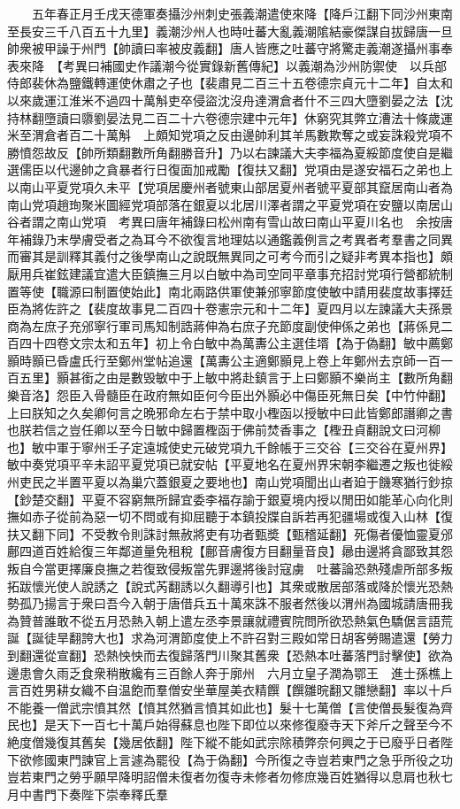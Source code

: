 　　五年春正月壬戌天德軍奏攝沙州刺史張義潮遣使來降【降戶江翻下同沙州東南至長安三千八百五十九里】義潮沙州人也時吐蕃大亂義潮隂結豪傑謀自拔歸唐一旦帥衆被甲譟于州門【帥讀曰率被皮義翻】唐人皆應之吐蕃守將驚走義潮遂攝州事奉表來降　【考異曰補國史作議潮今從實錄新舊傳紀】以義潮為沙州防禦使　以兵部侍郎裴休為鹽鐵轉運使休肅之子也【裴肅見二百三十五卷德宗貞元十二年】自太和以來歲運江淮米不過四十萬斛吏卒侵盜沈沒舟達渭倉者什不三四大墮劉晏之法【沈持林翻墮讀曰隳劉晏法見二百二十六卷德宗建中元年】休窮究其弊立漕法十條歲運米至渭倉者百二十萬斛　上頗知党項之反由邊帥利其羊馬數欺奪之或妄誅殺党項不勝憤怨故反【帥所類翻數所角翻勝音升】乃以右諫議大夫李福為夏綏節度使自是繼選儒臣以代邊帥之貪暴者行日復面加戒勵【復扶又翻】党項由是遂安福石之弟也上以南山平夏党項久未平【党項居慶州者號東山部居夏州者號平夏部其竄居南山者為南山党項趙珣聚米圖經党項部落在銀夏以北居川澤者謂之平夏党項在安鹽以南居山谷者謂之南山党項　考異曰唐年補錄曰松州南有雪山故曰南山平夏川名也　余按唐年補錄乃末學膚受者之為耳今不欲復言地理姑以通鑑義例言之考異者考羣書之同異而審其是訓釋其義付之後學南山之說既無異同之可考今而引之疑非考異本指也】頗厭用兵崔鉉建議宜遣大臣鎮撫三月以白敏中為司空同平章事充招討党項行營都統制置等使【職源曰制置使始此】南北兩路供軍使兼邠寧節度使敏中請用裴度故事擇廷臣為將佐許之【裴度故事見二百四十卷憲宗元和十二年】夏四月以左諫議大夫孫景商為左庶子充邠寧行軍司馬知制誥蔣伸為右庶子充節度副使伸係之弟也【蔣係見二百四十四卷文宗太和五年】初上令白敏中為萬夀公主選佳壻【為于偽翻】敏中薦鄭顥時顥已昏盧氏行至鄭州堂帖追還【萬夀公主適鄭顥見上卷上年鄭州去京師一百一百五里】顥甚銜之由是數毁敏中于上敏中將赴鎮言于上曰鄭顥不樂尚主【數所角翻樂音洛】怨臣入骨髓臣在政府無如臣何今臣出外顥必中傷臣死無日矣【中竹仲翻】上曰朕知之久矣卿何言之晩邪命左右于禁中取小檉函以授敏中曰此皆鄭郎譖卿之書也朕若信之豈任卿以至今日敏中歸置檉函于佛前焚香事之【檉丑貞翻說文曰河柳也】敏中軍于寧州壬子定遠城使史元破党項九千餘帳于三交谷【三交谷在夏州界】敏中奏党項平辛未詔平夏党項已就安帖【平夏地名在夏州界宋朝李繼遷之叛也徙綏州吏民之半置平夏以為巢穴蓋銀夏之要地也】南山党項聞出山者廹于饑寒猶行鈔掠【鈔楚交翻】平夏不容窮無所歸宜委李福存諭于銀夏境内授以閒田如能革心向化則撫如赤子從前為惡一切不問或有抑屈聽于本鎮投牒自訴若再犯疆場或復入山林【復扶又翻下同】不受教令則誅討無赦將吏有功者甄奬【甄稽延翻】死傷者優恤靈夏邠鄜四道百姓給復三年鄰道量免租稅【鄜音膚復方目翻量音良】曏由邊將貪鄙致其怨叛自今當更擇廉良撫之若復致侵叛當先罪邊將後討寇虜　吐蕃論恐熱殘虐所部多叛拓跋懷光使人說誘之【說式芮翻誘以久翻導引也】其衆或散居部落或降於懷光恐熱勢孤乃揚言于衆曰吾今入朝于唐借兵五十萬來誅不服者然後以渭州為國城請唐冊我為贊普誰敢不從五月恐熱入朝上遣左丞李景讓就禮賓院問所欲恐熱氣色驕倨言語荒誕【誕徒旱翻誇大也】求為河渭節度使上不許召對三殿如常日胡客勞賜遣還【勞力到翻還從宣翻】恐熱怏怏而去復歸落門川聚其舊衆【恐熱本吐蕃落門討擊使】欲為邊患會久雨乏食衆稍散纔有三百餘人奔于廓州　六月立皇子潤為鄂王　進士孫樵上言百姓男耕女織不自温飽而羣僧安坐華屋美衣精饌【饌雛晥翻又雛戀翻】率以十戶不能養一僧武宗憤其然【憤其然猶言憤其如此也】髮十七萬僧【言使僧長髮復為齊民也】是天下一百七十萬戶始得蘇息也陛下即位以來修復廢寺天下斧斤之聲至今不絶度僧幾復其舊矣【幾居依翻】陛下縱不能如武宗除積弊奈何興之于已廢乎日者陛下欲修國東門諫官上言遽為罷役【為于偽翻】今所復之寺豈若東門之急乎所役之功豈若東門之勞乎願早降明詔僧未復者勿復寺未修者勿修庶幾百姓猶得以息肩也秋七月中書門下奏陛下崇奉釋氏羣
